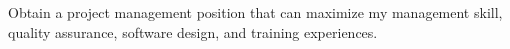 Obtain a project management position
that can maximize my management skill,
     quality assurance,
     software design,
     and training experiences.
